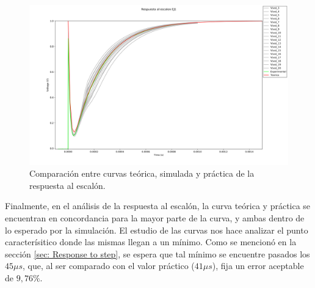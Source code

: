 \begin{figure}[H]
    \centering
    \begin{minipage}{\textwidth}
        \centering
        \includegraphics[width=\textwidth]{EJ1/Resp_al_escalon_EJ1.png}
        \caption{Comparaci\'on entre curvas teórica, simulada y práctica de la respuesta al escalón.}
        \label{fig: Response to step}
    \end{minipage}\hfill
\end{figure}
Finalmente, en el análisis de la respuesta al escalón, la curva teórica y práctica se encuentran en concordancia para la mayor parte de la curva, y ambas dentro de lo esperado por la simulación.
El estudio de las curvas nos hace analizar el punto caracterísitico donde las mismas llegan a un mínimo.
Como se mencionó en la sección \ref{sec: Response to step}, se espera que tal mínimo se encuentre pasados los $45\mu s$, que, al ser comparado con el valor práctico ($41\mu s$), fija un error aceptable de $9,76\%$.